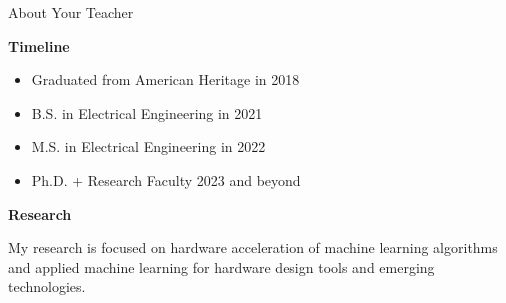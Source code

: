 \documentclass[]{beamer}
\begin{document}
\begin{frame}{About Your Teacher}
    
    \textbf{Timeline}
    \begin{itemize}
        \item Graduated from American Heritage in 2018
        \item B.S. in Electrical Engineering in 2021
        \item M.S. in Electrical Engineering in 2022
        \item Ph.D. + Research Faculty 2023 and beyond
    \end{itemize}
    
    \textbf{Research}

    My research is focused on hardware acceleration of machine learning algorithms and applied machine learning for hardware design tools and emerging technologies.

    \vspace{\baselineskip}


\end{frame}
\end{document}
